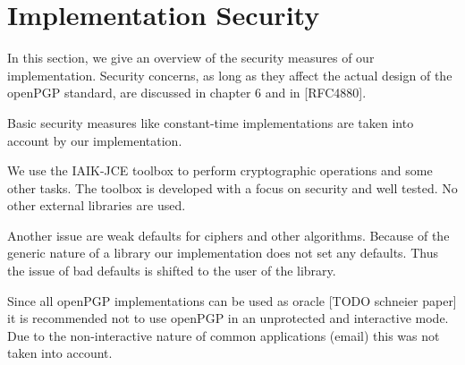 



%
%
%
%
%
%

\section{Implementation Security}
In this section, we give an overview of the security measures of our implementation. 
Security concerns, as long as they affect the actual design of the openPGP standard, are discussed in chapter 6 and in [RFC4880]. 

Basic security measures like constant-time implementations are taken into account by our implementation.

We use the IAIK-JCE toolbox to perform cryptographic operations and some other tasks. The toolbox is developed with a focus on security and well tested. No other external libraries are used.

Another issue are weak defaults for ciphers and other algorithms. Because of the generic nature of a library our implementation does not set any defaults. Thus the issue of bad defaults is shifted to the user of the library.

Since all openPGP implementations can be used as oracle [TODO schneier paper] it is recommended not to use openPGP in an unprotected and interactive mode. Due to the non-interactive nature of common applications (email) this was not taken into account.







